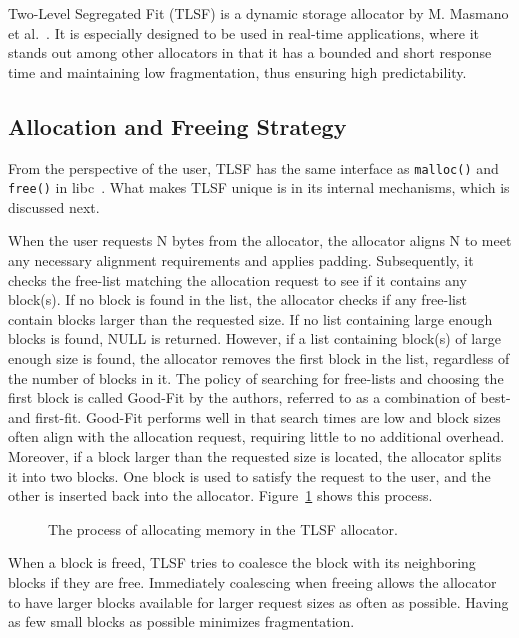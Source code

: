 
Two-Level Segregated Fit (TLSF) is a dynamic storage allocator by M. Masmano et al.~\cite{TLSF}. It is especially designed to be used in real-time applications, where it stands out among other allocators in that it has a bounded and short response time and maintaining low fragmentation, thus ensuring high predictability. 

\subsection{Allocation and Freeing Strategy}

From the perspective of the user, TLSF has the same interface as \texttt{malloc()} and \texttt{free()} in libc~\cite{mallocman}. What makes TLSF unique is in its internal mechanisms, which is discussed next.

When the user requests N bytes from the allocator, the allocator aligns N to meet any necessary alignment requirements and applies padding. Subsequently, it checks the free-list matching the allocation request to see if it contains any block(s). If no block is found in the list, the allocator checks if any free-list contain blocks larger than the requested size. If no list containing large enough blocks is found, NULL is returned. However, if a list containing block(s) of large enough size is found, the allocator removes the first block in the list, regardless of the number of blocks in it. The policy of searching for free-lists and choosing the first block is called Good-Fit by the authors, referred to as a combination of best- and first-fit. Good-Fit performs well in that search times are low and block sizes often align with the allocation request, requiring little to no additional overhead. Moreover, if a block larger than the requested size is located, the allocator splits it into two blocks. One block is used to satisfy the request to the user, and the other is inserted back into the allocator. Figure~\ref{fig:tlsf_allocation} shows this process.

\begin{figure}[H]
    \centering
    
    \caption{The process of allocating memory in the TLSF allocator.}
    \label{fig:tlsf_allocation}
\end{figure}

When a block is freed, TLSF tries to coalesce the block with its neighboring blocks if they are free. Immediately coalescing when freeing allows the allocator to have larger blocks available for larger request sizes as often as possible. Having as few small blocks as possible minimizes fragmentation.


